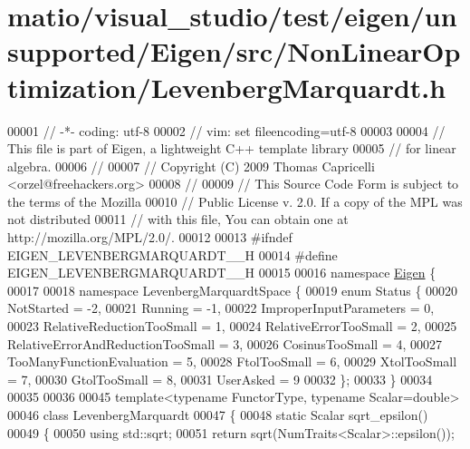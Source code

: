 \hypertarget{matio_2visual__studio_2test_2eigen_2unsupported_2_eigen_2src_2_non_linear_optimization_2_levenberg_marquardt_8h_source}{}\section{matio/visual\+\_\+studio/test/eigen/unsupported/\+Eigen/src/\+Non\+Linear\+Optimization/\+Levenberg\+Marquardt.h}
\label{matio_2visual__studio_2test_2eigen_2unsupported_2_eigen_2src_2_non_linear_optimization_2_levenberg_marquardt_8h_source}

\begin{DoxyCode}
00001 \textcolor{comment}{// -*- coding: utf-8}
00002 \textcolor{comment}{// vim: set fileencoding=utf-8}
00003 
00004 \textcolor{comment}{// This file is part of Eigen, a lightweight C++ template library}
00005 \textcolor{comment}{// for linear algebra.}
00006 \textcolor{comment}{//}
00007 \textcolor{comment}{// Copyright (C) 2009 Thomas Capricelli <orzel@freehackers.org>}
00008 \textcolor{comment}{//}
00009 \textcolor{comment}{// This Source Code Form is subject to the terms of the Mozilla}
00010 \textcolor{comment}{// Public License v. 2.0. If a copy of the MPL was not distributed}
00011 \textcolor{comment}{// with this file, You can obtain one at http://mozilla.org/MPL/2.0/.}
00012 
00013 \textcolor{preprocessor}{#ifndef EIGEN\_LEVENBERGMARQUARDT\_\_H}
00014 \textcolor{preprocessor}{#define EIGEN\_LEVENBERGMARQUARDT\_\_H}
00015 
00016 \textcolor{keyword}{namespace }\hyperlink{namespace_eigen}{Eigen} \{ 
00017 
00018 \textcolor{keyword}{namespace }LevenbergMarquardtSpace \{
00019     \textcolor{keyword}{enum} Status \{
00020         NotStarted = -2,
00021         Running = -1,
00022         ImproperInputParameters = 0,
00023         RelativeReductionTooSmall = 1,
00024         RelativeErrorTooSmall = 2,
00025         RelativeErrorAndReductionTooSmall = 3,
00026         CosinusTooSmall = 4,
00027         TooManyFunctionEvaluation = 5,
00028         FtolTooSmall = 6,
00029         XtolTooSmall = 7,
00030         GtolTooSmall = 8,
00031         UserAsked = 9
00032     \};
00033 \}
00034 
00035 
00036 
00045 \textcolor{keyword}{template}<\textcolor{keyword}{typename} FunctorType, \textcolor{keyword}{typename} Scalar=\textcolor{keywordtype}{double}>
00046 \textcolor{keyword}{class }LevenbergMarquardt
00047 \{
00048     \textcolor{keyword}{static} Scalar sqrt\_epsilon()
00049     \{
00050       \textcolor{keyword}{using} std::sqrt;
00051       \textcolor{keywordflow}{return} sqrt(NumTraits<Scalar>::epsilon());

\end{DoxyCode}
